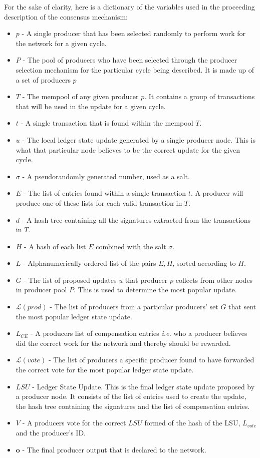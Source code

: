 For the sake of clarity, here is a dictionary of the variables used in the proceeding description of the consensus mechanism:

\begin{itemize}

\item $p$ - A single producer that has been selected randomly to perform work for the network for a given cycle.
\item $P$ - The pool of producers who have been selected through the producer selection mechanism for the particular cycle being described. It is made up of a set of producers $p$
\item $T$ - The mempool of any given producer $p$. It contains a group of transactions that will be used in the update for a given cycle.
\item $t$ - A single transaction that is found within the mempool $T$.
\item $u$ - The local ledger state update generated by a single producer node. This is what that particular node believes to be the correct update for the given cycle.
\item $\sigma$ - A pseudorandomly generated number, used as a salt.
\item $E$ - The list of entries found within a single transaction $t$. A producer will produce one of these lists for each valid transaction in $T$.
\item $d$ - A hash tree containing all the signatures extracted from the transactions in $T$.
\item $H$ - A hash of each list $E$ combined with the salt $\sigma$.
\item $L$ - Alphanumerically ordered list of the pairs $E,H$, sorted according to $H$.
\item $G$ - The list of proposed updates $u$ that producer $p$ collects from other nodes in producer pool $P$. This is used to determine the most popular update.
\item $\mathcal{L}(prod)$ - The list of producers from a particular producers' set $G$ that sent the most popular ledger state update.
\item $L_{CE}$ - A producers list of compensation entries \textit{i.e.} who a producer believes did the correct work for the network and thereby should be rewarded.
\item $\mathcal{L}(vote)$ - The list of producers a specific producer found to have forwarded the correct vote for the most popular ledger state update.
\item $LSU$ - Ledger State Update. This is the final ledger state update proposed by a producer node. It consists of the list of entries used to create the update, the hash tree containing the signatures and the list of compensation entries.
\item $V$ - A producers vote for the correct $LSU$ formed of the hash of the LSU, $L_{vote}$ and the producer's ID.
\item $\mathbf{o}$ - The final producer output that is declared to the network.
\end{itemize}
